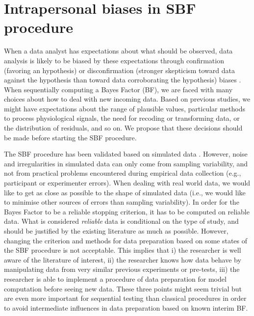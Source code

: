 \documentclass[a4paper,man,natbib,floatsintext,donotrepeattitle]{apa6}
\begin{document}
\section{Intrapersonal biases in SBF procedure}

When a data analyst has expectations about what should be observed, data analysis is likely to be biased by these expectations through confirmation (favoring an hypothesis) or disconfirmation (stronger skepticism toward data against the hypothesis than toward data corroborating the hypothesis) biases \citep{lilienfeld_blind_2017}.
When sequentially computing a Bayes Factor (BF), we are faced with many choices about how to deal with new incoming data. Based on previous studies, we might have expectations about the range of plausible values, particular methods to process physiological signals, the need for recoding or transforming data, or the distribution of residuals, and so on. We propose that these decisions should be made before starting the SBF procedure.

The SBF procedure has been validated based on simulated data \citep{schonbrodt_sequential_2017}. However, noise and irregularities in simulated data can only come from sampling variability, and not from practical problems encountered during empirical data collection (e.g., participant or experimenter errors). When dealing with real world data, we would like to get as close as possible to the shape of simulated data (i.e., we would like to minimise other sources of errors than sampling variability). In order for the Bayes Factor to be a reliable stopping criterion, it has to be computed on reliable data. What is considered \textit{reliable} data is conditional on the type of study, and should be justified by the existing literature as much as possible. However, changing the criterion and methods for data preparation based on some states of the SBF procedure is not acceptable. This implies that i) the researcher is well aware of the literature of interest, ii) the researcher knows how data behave by manipulating data from very similar previous experiments or pre-tests, iii) the researcher is able to implement a procedure of data preparation for model computation before seeing new data. These three points might seem trivial but are even more important for sequential testing than classical procedures in order to avoid intermediate influences in data preparation based on known interim BF.
\end{document}
